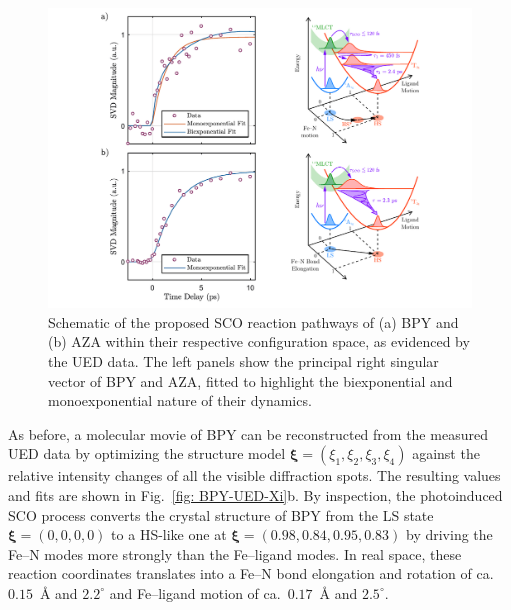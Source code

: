 \begin{figure}[b!]
  \centering
  \includegraphics[width = \textwidth]{Figures/fig_BPY_UED_picture.pdf}
  \caption[Schematic of the proposed SCO reaction pathways of BPY and AZA.]{
    Schematic of the proposed SCO reaction pathways of (a) BPY and (b) AZA
    within their respective configuration space, as evidenced by the UED data.
    The left panels show the principal right singular vector of BPY and AZA,
    fitted to highlight the biexponential and monoexponential nature of their dynamics.
  }
  \label{fig: BPY-UED-picture}
\end{figure}

As before, a molecular movie of BPY can be reconstructed from the measured UED data
by optimizing the structure model $\boldsymbol{\xi} = (\xi_1, \xi_2, \xi_3, \xi_4)$
against the relative intensity changes of all the visible diffraction spots.
%
The resulting values and fits are shown in Fig.~\ref{fig: BPY-UED-Xi}b.
%
By inspection, the photoinduced SCO process converts the crystal structure of BPY
from the LS state $\boldsymbol{\xi} = (0, 0, 0, 0)$ to a HS-like one
at $\boldsymbol{\xi} = (0.98, 0.84, 0.95, 0.83)$
by driving the Fe--N modes more strongly than the Fe--ligand modes.
%
In real space, these reaction coordinates translates into
a Fe--N bond elongation and rotation of ca.~$0.15$~\AA{} and $2.2^\circ$
and Fe--ligand motion of ca.~$0.17$~\AA{} and $2.5^\circ$.

